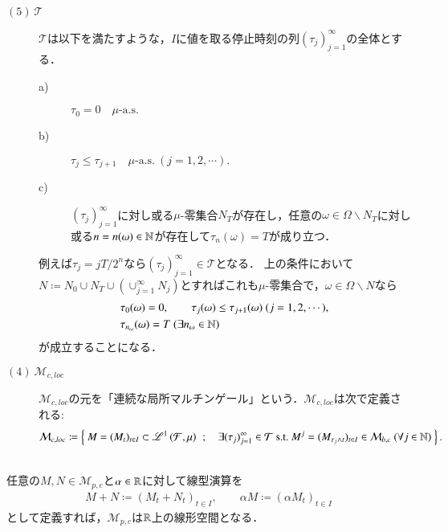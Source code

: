 \begin{description}
		\item[$\mathrm{(5)}\ \mathcal{T}$]
			$\mathcal{T}$は以下を満たすような，$I$に値を取る停止時刻の列$(\tau_j)_{j=1}^{\infty}$の全体とする．
			\begin{description}
				\item[a)] $\tau_0 = 0 \quad \mbox{$\mu$-a.s.}$
				\item[b)] $\tau_j \leq \tau_{j+1} \quad \mbox{$\mu$-a.s.}\ (j=1,2,\cdots).$
				\item[c)] $(\tau_j)_{j=1}^{\infty}$に対し或る$\mu$-零集合$N_T$が存在し，任意の$\omega \in \Omega \backslash N_T$に対し或る$n = n(\omega) \in \mathbb{N}$が存在して$\tau_n(\omega)=T$が成り立つ．
			\end{description}
			例えば$\tau_j = jT/2^n$なら$(\tau_j)_{j=1}^{\infty} \in \mathcal{T}$となる．
			上の条件において$N \coloneqq N_0 \cup N_T \cup (\cup_{j=1}^{\infty}N_j)$とすればこれも$\mu$-零集合で，$\omega \in \Omega \backslash N$なら
			\begin{align}
				&\tau_0(\omega) = 0,\qquad \tau_j(\omega) \leq \tau_{j+1}(\omega)\ (j=1,2,\cdots),\\
				&\tau_{n_\omega}(\omega) = T\ (\exists n_\omega \in \mathbb{N})
			\end{align}
			が成立することになる．
			
		\item[$\mathrm{(4)}\ \mathcal{M}_{c,loc}$]
			$\mathcal{M}_{c,loc}$の元を「連続な局所マルチンゲール」という．$\mathcal{M}_{c,loc}$は次で定義される:
			\begin{align}
				\mathcal{M}_{c,loc} \coloneqq 
				\left\{\ M = (M_t)_{t \in I} \subset \mathscr{L}^{1} \left(\mathcal{F},\mu\right)\ \, ; \quad \exists (\tau_j)_{j=1}^{\infty} \in \mathcal{T}\ \mathrm{s.t.}\ M^j = (M_{\tau_j \wedge t})_{t \in I} \in \mathcal{M}_{b,c}\ (\forall j \in \mathbb{N})\ \right\}.
			\end{align}
	\end{description}
	
	\begin{itembox}[l]{}
		\begin{lem}\mbox{}\\
			任意の$M,N \in \mathcal{M}_{p,c}$と$\alpha \in \mathbb{R}$に対して線型演算を
			\begin{align}
				M + N \coloneqq (M_t + N_t)_{t \in I}, \qquad \alpha M \coloneqq (\alpha M_t)_{t \in I}
				\label{eq:mart_linear_arithmetic_0}
			\end{align}
			として定義すれば，$\mathcal{M}_{p,c}$は$\mathbb{R}$上の線形空間となる．
		\end{lem}
	\end{itembox}
	
